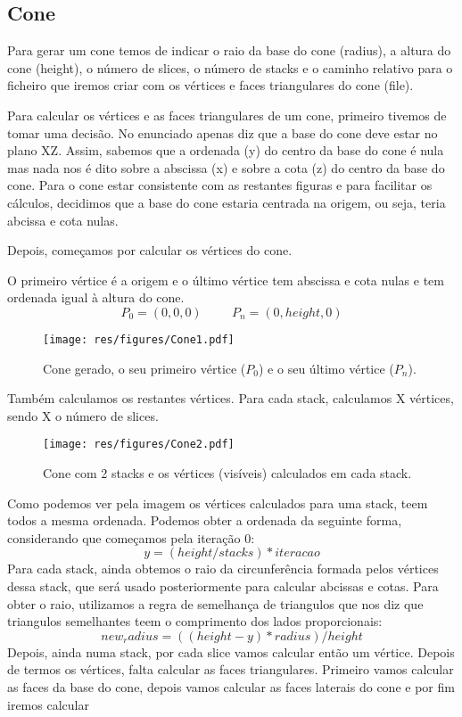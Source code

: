 \documentclass[12pt, a4paper]{article}
\begin{document}
\subsection{Cone}
Para gerar um cone temos de indicar o raio da base do cone (radius), a altura do
cone (height), o número de slices, o número de stacks e o caminho relativo para o
ficheiro que iremos criar com os vértices e faces triangulares do cone (file).

Para calcular os vértices e as faces triangulares de um cone, primeiro tivemos
de tomar uma decisão. No enunciado apenas diz que a base do cone deve estar no
plano XZ. Assim, sabemos que a ordenada (y) do centro da base do cone é nula
mas nada nos é dito sobre a abscissa (x) e sobre a cota (z) do centro da base
do cone. Para o cone estar consistente com as restantes figuras e para facilitar
os cálculos, decidimos que a base do cone estaria centrada na origem, ou seja,
teria abcissa e cota nulas.

Depois, começamos por calcular os vértices do cone.

O primeiro vértice é a origem e o último vértice tem abscissa e cota nulas e
tem ordenada igual à altura do cone.
$$
P_0 = (0, 0, 0)
\hspace{1cm}
P_n = (0, height, 0)
$$

\begin{figure}[H]
    \centering
    \texttt{[image: res/figures/Cone1.pdf]}
    \caption{
        Cone gerado, o seu primeiro vértice ($P_0$) e o seu último vértice ($P_n$).
    }
\end{figure}

Também calculamos os restantes vértices. Para cada stack, calculamos X
vértices, sendo X o número de slices.

\begin{figure}[H]
    \centering
    \texttt{[image: res/figures/Cone2.pdf]}
    \caption{
        Cone com 2 stacks e os vértices (visíveis) calculados em cada stack.
    }
\end{figure}

Como podemos ver pela imagem os vértices calculados para uma stack,
teem todos a mesma ordenada. Podemos obter a ordenada da seguinte forma,
considerando que começamos pela iteração 0:
$$
y = (height/stacks) * iteracao
$$
Para cada stack, ainda obtemos o raio da circunferência formada pelos vértices dessa stack,
que será usado posteriormente para calcular abcissas e cotas.
Para obter o raio, utilizamos a regra de semelhança de triangulos que nos diz que triangulos
semelhantes teem o comprimento dos lados proporcionais:
$$
new_radius = ((height - y) * radius) / height
$$
Depois, ainda numa stack, por cada slice vamos calcular então um vértice.
Depois de termos os vértices, falta calcular as faces triangulares. Primeiro vamos calcular
as faces da base do cone, depois vamos calcular as faces laterais do cone e por fim iremos
calcular
\end{document}
